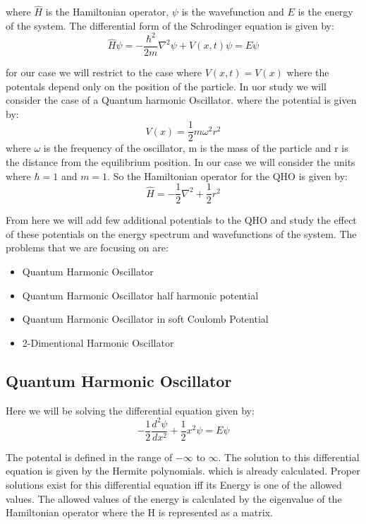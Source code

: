 \documentclass{article}
\begin{document}
\begin{multicols}{2}
where $\hat{H}$ is the Hamiltonian operator, $\psi$ is the wavefunction and $E$ is the energy of the system. The differential form of the Schrodinger equation is given by:
\begin{equation}
    \hat{H}\psi = -\frac{\hbar^2}{2m}\nabla^2\psi + V(x,t)\psi = E\psi
\end{equation}

for our case we will restrict to the case where $V(x,t) = V(x)$ where the potentals depend only on the position of the particle. In uor study we will consider the case of a Quantum harmonic Oscillator. where the potential is given by:
\begin{equation}
    V(x) = \frac{1}{2}m\omega^2r^2
\end{equation}
where $\omega$ is the frequency of the oscillator, m is the mass of the particle and r is the distance from the equilibrium position. In our case we will consider the units where $\hbar = 1$ and $m = 1$. So the Hamiltonian operator for the QHO is given by:
\begin{equation}
    \hat{H} = -\frac{1}{2}\nabla^2 + \frac{1}{2}r^2
\end{equation}

From here we will add few additional potentials to the QHO and study the effect of these potentials on the energy spectrum and wavefunctions of the system. 
The problems that we are focusing on are:
\begin{itemize}
    \item Quantum Harmonic Oscillator
    \item Quantum Harmonic Oscillator half harmonic potential
    \item Quantum Harmonic Oscillator in soft Coulomb Potential
    \item 2-Dimentional Harmonic Oscillator
\end{itemize}


\subsection{\label{QHO}Quantum Harmonic Oscillator}
Here we will be solving the differential equation given by:
\begin{equation}
    -\frac{1}{2}\frac{d^2\psi}{dx^2} + \frac{1}{2}x^2\psi = E\psi
\end{equation}

The potental is defined in the range of $-\infty$ to $\infty$. The solution to this differential equation is given by the Hermite polynomials. which is already calculated.
Proper solutions exist for this  differential equation iff its Energy is one of the allowed values. The allowed values of the energy is calculated by the eigenvalue of the Hamiltonian operator where the H is represented as a matrix.


\end{multicols}
\end{document}
